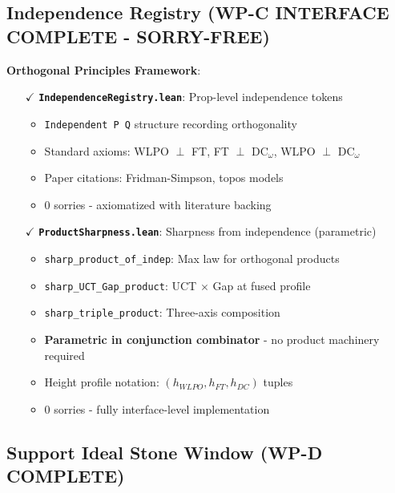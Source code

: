 \documentclass[11pt]{article}
\theoremstyle{definition}
\theoremstyle{remark}
\begin{document}
\subsection{Independence Registry (WP-C INTERFACE COMPLETE - SORRY-FREE)}

\textbf{Orthogonal Principles Framework}:
\begin{itemize}
\item[$\checkmark$] \textbf{\texttt{IndependenceRegistry.lean}}: Prop-level independence tokens
  \begin{itemize}
  \item \texttt{Independent P Q} structure recording orthogonality
  \item Standard axioms: WLPO $\perp$ FT, FT $\perp$ DC$_\omega$, WLPO $\perp$ DC$_\omega$
  \item Paper citations: Fridman-Simpson, topos models
  \item 0 sorries - axiomatized with literature backing
  \end{itemize}
\item[$\checkmark$] \textbf{\texttt{ProductSharpness.lean}}: Sharpness from independence (parametric)
  \begin{itemize}
  \item \texttt{sharp\_product\_of\_indep}: Max law for orthogonal products
  \item \texttt{sharp\_UCT\_Gap\_product}: UCT $\times$ Gap at fused profile
  \item \texttt{sharp\_triple\_product}: Three-axis composition
  \item \textbf{Parametric in conjunction combinator} - no product machinery required
  \item Height profile notation: $(h_{WLPO}, h_{FT}, h_{DC})$ tuples
  \item 0 sorries - fully interface-level implementation
  \end{itemize}
\end{itemize}

\subsection{Support Ideal Stone Window (WP-D COMPLETE)}
\end{document}
